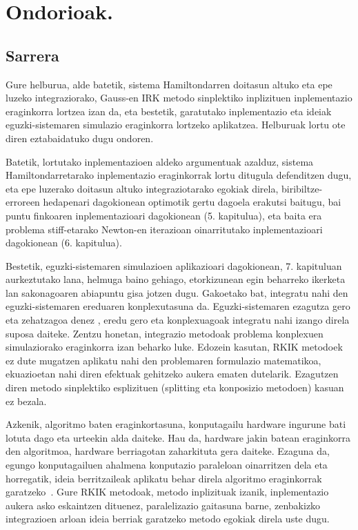 \chapter{Ondorioak.}

\section*{Sarrera}

Gure helburua, alde batetik, sistema Hamiltondarren doitasun altuko eta epe luzeko integraziorako, Gauss-en IRK metodo sinplektiko inplizituen inplementazio eraginkorra lortzea izan da, eta bestetik, garatutako inplementazio eta ideiak eguzki-sistemaren simulazio eraginkorra lortzeko aplikatzea. Helburuak lortu ote diren eztabaidatuko dugu ondoren.

Batetik, lortutako inplementazioen aldeko argumentuak azalduz, sistema Hamiltondarretarako inplementazio eraginkorrak lortu ditugula defenditzen dugu, eta epe luzerako doitasun altuko integraziotarako egokiak direla, biribiltze-erroreen hedapenari dagokionean optimotik gertu dagoela erakutsi baitugu, bai puntu finkoaren inplementazioari dagokionean (5. kapitulua), eta baita era problema stiff-etarako Newton-en iterazioan oinarritutako inplementazioari dagokionean (6. kapitulua).

Bestetik, eguzki-sistemaren simulazioen aplikazioari dagokionean, 7. kapituluan aurkeztutako lana, helmuga baino gehiago, etorkizunean egin beharreko ikerketa lan sakonagoaren abiapuntu gisa jotzen dugu.  Gakoetako bat, integratu nahi den eguzki-sistemaren ereduaren konplexutasuna da. Eguzki-sistemaren ezagutza gero eta zehatzagoa denez \cite{Kaplan2015}, eredu gero eta konplexuagoak integratu nahi izango direla suposa daiteke. Zentzu honetan, integrazio metodoak problema konplexuen simulaziorako eraginkorra izan beharko luke. Edozein kasutan, RKIK metodoek ez dute mugatzen aplikatu nahi den problemaren formulazio matematikoa,  ekuazioetan nahi diren efektuak gehitzeko aukera ematen dutelarik. Ezagutzen diren metodo sinplektiko esplizituen (splitting eta konposizio metodoen) kasuan ez bezala.

Azkenik, algoritmo baten eraginkortasuna, konputagailu hardware ingurune bati lotuta dago eta urteekin alda daiteke. Hau da,   hardware jakin batean eraginkorra den algoritmoa, hardware berriagotan zaharkituta gera daiteke.  Ezaguna da, egungo konputagailuen ahalmena konputazio paraleloan oinarritzen dela eta horregatik, ideia berritzaileak aplikatu behar direla algoritmo eraginkorrak garatzeko~\cite{Dongarra2017}. Gure RKIK metodoak, metodo inplizituak izanik, inplementazio aukera asko eskaintzen dituenez, paralelizazio gaitasuna barne, zenbakizko integrazioen arloan ideia berriak garatzeko metodo egokiak direla uste dugu.



